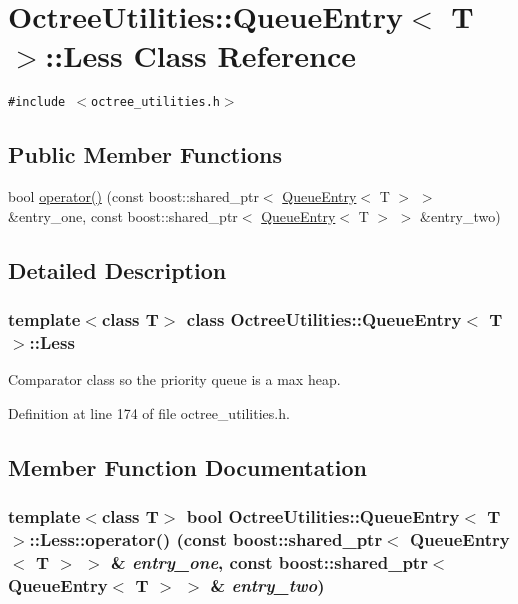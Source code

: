 \hypertarget{class_octree_utilities_1_1_queue_entry_1_1_less}{
\section{OctreeUtilities::QueueEntry$<$ T $>$::Less Class Reference}
\label{class_octree_utilities_1_1_queue_entry_1_1_less}
}
{\tt \#include $<$octree\_\-utilities.h$>$}

\subsection*{Public Member Functions}
\begin{CompactItemize}
\item 
bool \hyperlink{class_octree_utilities_1_1_queue_entry_1_1_less_3602baab3d940a3838266445d3360ddb}{operator()} (const boost::shared\_\-ptr$<$ \hyperlink{class_octree_utilities_1_1_queue_entry}{QueueEntry}$<$ T $>$ $>$ \&entry\_\-one, const boost::shared\_\-ptr$<$ \hyperlink{class_octree_utilities_1_1_queue_entry}{QueueEntry}$<$ T $>$ $>$ \&entry\_\-two)
\end{CompactItemize}


\subsection{Detailed Description}
\subsubsection*{template$<$class T$>$ class OctreeUtilities::QueueEntry$<$ T $>$::Less}

Comparator class so the priority queue is a max heap. 

Definition at line 174 of file octree\_\-utilities.h.

\subsection{Member Function Documentation}
\hypertarget{class_octree_utilities_1_1_queue_entry_1_1_less_3602baab3d940a3838266445d3360ddb}{
\subsubsection[operator()]{\setlength{\rightskip}{0pt plus 5cm}template$<$class T$>$ bool {\bf OctreeUtilities::QueueEntry}$<$ T $>$::Less::operator() (const boost::shared\_\-ptr$<$ {\bf QueueEntry}$<$ T $>$ $>$ \& {\em entry\_\-one}, \/  const boost::shared\_\-ptr$<$ {\bf QueueEntry}$<$ T $>$ $>$ \& {\em entry\_\-two})}}
\label{class_octree_utilities_1_1_queue_entry_1_1_less_3602baab3d940a3838266445d3360ddb}


